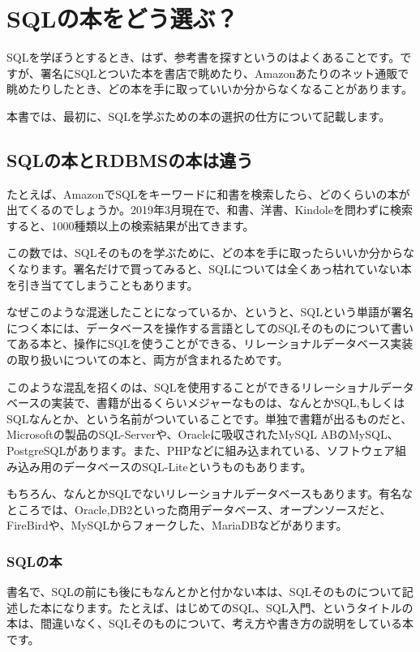 \chapter{SQLの本をどう選ぶ？}

SQLを学ぼうとするとき、はず、参考書を探すというのはよくあることです。ですが、署名にSQLとついた本を書店で眺めたり、Amazonあたりのネット通販で眺めたりしたとき、どの本を手に取っていいか分からなくなることがあります。

本書では、最初に、SQLを学ぶための本の選択の仕方について記載します。

\section{SQLの本とRDBMSの本は違う}

たとえば、AmazonでSQLをキーワードに和書を検索したら、どのくらいの本が出てくるのでしょうか。2019年3月現在で、和書、洋書、Kindoleを問わずに検索すると、1000種類以上の検索結果が出てきます。

この数では、SQLそのものを学ぶために、どの本を手に取ったらいいか分からなくなります。署名だけで買ってみると、SQLについては全くあっ枯れていない本を引き当ててしまうこともあります。

なぜこのような混迷したことになっているか、というと、SQLという単語が署名につく本には、データベースを操作する言語としてのSQLそのものについて書いてある本と、操作にSQLを使うことができる、リレーショナルデータベース実装の取り扱いについての本と、両方が含まれるためです。

このような混乱を招くのは、SQLを使用することができるリレーショナルデータベースの実装で、書籍が出るくらいメジャーなものは、なんとかSQL,もしくはSQLなんとか、という名前がついていることです。単独で書籍が出るものだと、Microsoftの製品のSQL-Serverや、Oracleに吸収されたMySQL ABのMySQL、PostgreSQLがあります。また、PHPなどに組み込まれている、ソフトウェア組み込み用のデータベースのSQL-Liteというものもあります。

もちろん、なんとかSQLでないリレーショナルデータベースもあります。有名なところでは、Oracle,DB2といった商用データベース、オープンソースだと、FireBirdや、MySQLからフォークした、MariaDBなどがあります。

\subsection{SQLの本}

書名で、SQLの前にも後にもなんとかと付かない本は、SQLそのものについて記述した本になります。たとえば、はじめてのSQL、SQL入門、というタイトルの本は、間違いなく、SQLそのものについて、考え方や書き方の説明をしている本です。

